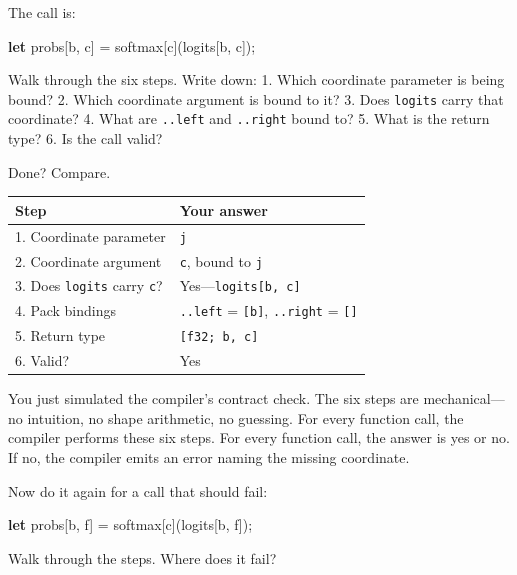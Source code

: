 \documentclass[11pt,titlepage]{article}
\newenvironment{Shaded}{}{}
\newcommand{\KeywordTok}[1]{\textcolor[rgb]{0.00,0.44,0.13}{\textbf{#1}}}
\newcommand{\NormalTok}[1]{#1}
\newcommand{\OperatorTok}[1]{\textcolor[rgb]{0.40,0.40,0.40}{#1}}
\begin{document}
The call is:

\begin{Shaded}
\begin{Highlighting}[]
\KeywordTok{let}\NormalTok{ probs}\OperatorTok{[}\NormalTok{b, c}\OperatorTok{]}\NormalTok{ = softmax}\OperatorTok{[}\NormalTok{c}\OperatorTok{]}\NormalTok{(logits}\OperatorTok{[}\NormalTok{b, c}\OperatorTok{]}\NormalTok{);}
\end{Highlighting}
\end{Shaded}

Walk through the six steps. Write down: 1. Which coordinate parameter is
being bound? 2. Which coordinate argument is bound to it? 3. Does
\texttt{logits} carry that coordinate? 4. What are \texttt{..left} and
\texttt{..right} bound to? 5. What is the return type? 6. Is the call
valid?

Done? Compare.

\begin{longtable}[]{@{}ll@{}}
\toprule
Step & Your answer\tabularnewline
\midrule
\endhead
1. Coordinate parameter & \texttt{j}\tabularnewline
2. Coordinate argument & \texttt{c}, bound to \texttt{j}\tabularnewline
3. Does \texttt{logits} carry \texttt{c}? &
Yes---\texttt{logits{[}b,\ c{]}}\tabularnewline
4. Pack bindings & \texttt{..left} = \texttt{{[}b{]}}, \texttt{..right}
= \texttt{{[}{]}}\tabularnewline
5. Return type & \texttt{{[}f32;\ b,\ c{]}}\tabularnewline
6. Valid? & Yes\tabularnewline
\bottomrule
\end{longtable}

You just simulated the compiler's contract check. The six steps are
mechanical---no intuition, no shape arithmetic, no guessing. For every
function call, the compiler performs these six steps. For every function
call, the answer is yes or no. If no, the compiler emits an error naming
the missing coordinate.

Now do it again for a call that should fail:

\begin{Shaded}
\begin{Highlighting}[]
\KeywordTok{let}\NormalTok{ probs}\OperatorTok{[}\NormalTok{b, f}\OperatorTok{]}\NormalTok{ = softmax}\OperatorTok{[}\NormalTok{c}\OperatorTok{]}\NormalTok{(logits}\OperatorTok{[}\NormalTok{b, f}\OperatorTok{]}\NormalTok{);}
\end{Highlighting}
\end{Shaded}

Walk through the steps. Where does it fail?
\end{document}
